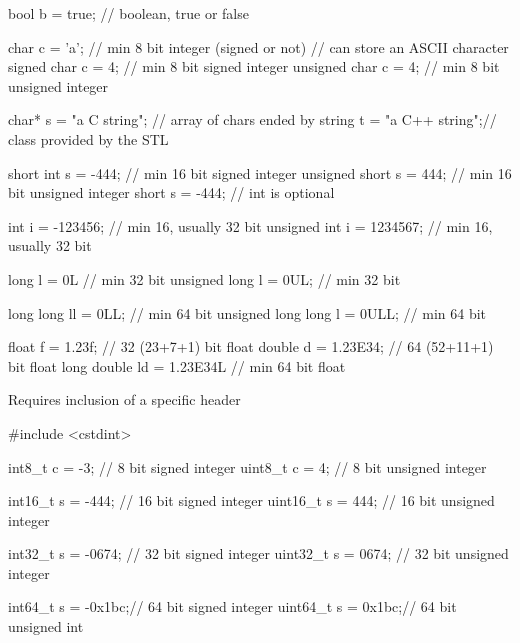 \begin{frame}[fragile]
  \begin{cppcode}
    bool b = true;            // boolean, true or false

    char c = 'a';             // min 8 bit integer (signed or not)
                              // can store an ASCII character
    signed char c = 4;        // min 8 bit signed integer
    unsigned char c = 4;      // min 8 bit unsigned integer

    char* s = "a C string";   // array of chars ended by \0
    string t = "a C++ string";// class provided by the STL

    short int s = -444;       // min 16 bit signed integer
    unsigned short s = 444;   // min 16 bit unsigned integer
    short s = -444;           // int is optional
  \end{cppcode}
\end{frame}
\begin{frame}[fragile]
  \begin{cppcode}
    int i = -123456;          // min 16, usually 32 bit
    unsigned int i = 1234567; // min 16, usually 32 bit

    long l = 0L               // min 32 bit
    unsigned long l = 0UL;    // min 32 bit

    long long ll = 0LL;          // min 64 bit
    unsigned long long l = 0ULL; // min 64 bit

    float f = 1.23f;          // 32 (23+7+1) bit float
    double d = 1.23E34;       // 64 (52+11+1) bit float
    long double ld = 1.23E34L // min 64 bit float
  \end{cppcode}
\end{frame}

\begin{frame}[fragile]
  \alert{Requires inclusion of a specific header}
  \begin{cppcode}
    #include <cstdint>

    int8_t c = -3;     // 8 bit signed integer
    uint8_t c = 4;     // 8 bit unsigned integer

    int16_t s = -444;  // 16 bit signed integer
    uint16_t s = 444;  // 16 bit unsigned integer

    int32_t s = -0674; // 32 bit signed integer
    uint32_t s = 0674; // 32 bit unsigned integer

    int64_t s = -0x1bc;// 64 bit signed integer
    uint64_t s = 0x1bc;// 64 bit unsigned int
    \end{cppcode}
\end{frame}

